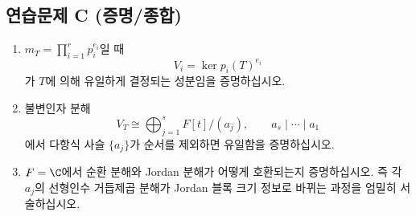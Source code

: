 \subsection*{연습문제 C (증명/종합)}
\begin{enumerate}[label=C\arabic*.]
\item $m_T=\prod_{i=1}^r p_i^{e_i}$일 때
\[
V_i=\ker p_i(T)^{e_i}
\]
가 $T$에 의해 유일하게 결정되는 성분임을 증명하십시오.
\item 불변인자 분해
\[
V_T\cong\bigoplus_{j=1}^s F[t]/(a_j),\qquad a_s\mid\cdots\mid a_1
\]
에서 다항식 사슬 $\{a_j\}$가 순서를 제외하면 유일함을 증명하십시오.
\item $F=\C$에서 순환 분해와 Jordan 분해가 어떻게 호환되는지 증명하십시오. 즉 각 $a_j$의 선형인수 거듭제곱 분해가 Jordan 블록 크기 정보로 바뀌는 과정을 엄밀히 서술하십시오.
\end{enumerate}